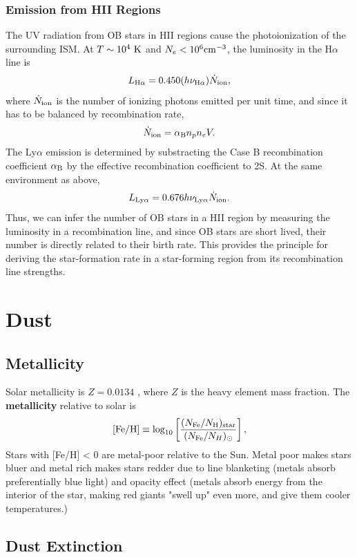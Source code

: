 \subsubsection{Emission from HII Regions}
\label{sec:org0cc8852}
The UV radiation from OB stars in HII regions cause the photoionization of the surrounding ISM. At \(T \sim 10^4~{\rm K}\) and \(N_e<10^6 {\rm cm^{-3}}\), the luminosity in the H\(\alpha\) line is $$L_{{\rm H}\alpha} = 0.450 (h \nu_{{\rm H}\alpha}) \dot{N}_{\rm ion},$$ where \(\dot{N}_{\rm ion}\) is the number of ionizing photons emitted per unit time, and since it has to be balanced by recombination rate, $$\dot{N}_{\rm ion} = \alpha_{\rm B} n_pn_eV.$$ The Ly\(\alpha\) emission is determined by substracting the Case B recombination coefficient \(\alpha_{\rm B}\) by the effective recombination coefficient to 2S. At the same environment as above, $$L_{{\rm Ly}\alpha} = 0.676 h \nu_{{\rm Ly}\alpha} \dot{N}_{\rm ion}.$$ Thus, we can infer the number of OB stars in a HII region by measuring the luminosity in a recombination line, and since OB stars are short lived, their number is directly related to their birth rate. This provides the principle for deriving the star-formation rate in a star-forming region from its recombination line strengths.


\section{Dust}
\label{sec:org675cf6c}
\subsection{Metallicity}
\label{sec:org9df3ad3}
Solar metallicity is \(Z = 0.0134\) \cite{Asplund2009}, where \(Z\) is the heavy element mass fraction. The \textbf{metallicity} relative to solar is $$[{\rm Fe}/{\rm H}] \equiv \log_{10} \left[ \frac{(N_{\rm Fe}/N_{\rm H})_{\rm star}}{(N_{\rm Fe}/N_H)_{\odot}} \right],$$ Stars with [Fe/H] < 0 are metal-poor relative to the Sun. Metal poor makes stars bluer and metal rich makes stars redder due to line blanketing (metals absorb preferentially blue light) and opacity effect (metals absorb energy from the interior of the star, making red giants "swell up" even more, and give them cooler temperatures.)

\subsection{Dust Extinction}
\label{sec:orgbd5d19e}

